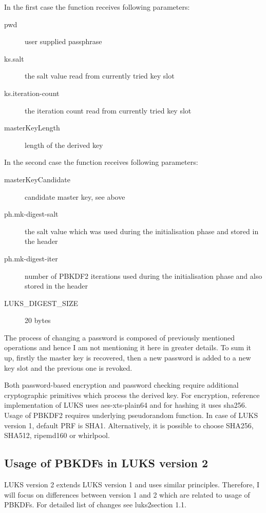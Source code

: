 \documentclass[nolof]{fithesis3}
\begin{document}
In the first case the function receives following parameters:

\begin{description}
\item[pwd] user supplied passphrase

\item[ks.salt] the salt value read from currently tried key slot

\item[ks.iteration-count] the iteration count read from currently tried key slot

\item[masterKeyLength] length of the derived key
\end{description}

In the second case the function receives following parameters:

\begin{description}
\item[masterKeyCandidate] candidate master key, see above

\item[ph.mk-digest-salt] the salt value which was used during the initialisation phase and stored in the header

\item[ph.mk-digest-iter] number of PBKDF2 iterations used during the initialisation phase and also stored in the header

\item[LUKS\_DIGEST\_SIZE] 20 bytes
\end{description}

The process of changing a password is composed of previously mentioned operations and hence I am not mentioning it here in greater details. To sum it up, firstly the master key is recovered, then a new password is added to a new key slot and the previous one is revoked.

Both password-based encryption and password checking require additional cryptographic primitives which process the derived key. For encryption, reference implementation of LUKS uses aes-xts-plain64 and for hashing it uses sha256. Usage of PBKDF2 requires underlying pseudorandom function. In case of LUKS version 1, default PRF is SHA1. Alternatively, it is possible to choose SHA256, SHA512, ripemd160 or whirlpool.

\subsection{Usage of PBKDFs in LUKS version 2}
LUKS version 2 extends LUKS version 1 and uses similar principles. Therefore, I will focus on differences between version 1 and 2 which are related to usage of PBKDFs. For detailed list of changes see \parencite{}{luks2}{section 1.1}.
\end{document}
